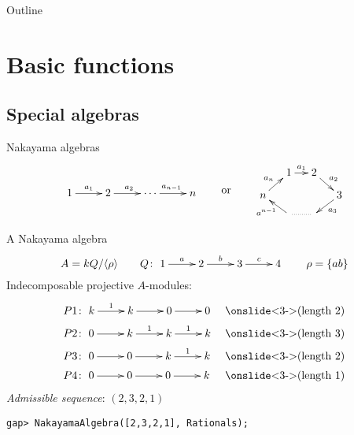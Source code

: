\newcommand{\QPAIntroPartNumber}{2}




\begin{frame}
  \titlepage
\end{frame}

\begin{frame}{Outline}
  \tableofcontents
\end{frame}

\section{Basic functions}

\subsection{Special algebras}

\begin{frame}{Nakayama algebras}
\[
\vcenter{\xymatrix{
1 \ar[r]^{a_1} &
2 \ar[r]^{a_2} &
\cdots
  \ar[r]^{a_{n-1}} &
n
}}
\qquad\text{or}\qquad
\vcenter{\xymatrix@R=.8em@C=1.2em{
& 
1 \ar[r]^{a_1} &
2 \ar[dr]^{a_2} \\
n \ar[ur]^{a_n} &&&
3 \ar[dl]^{a_3} \\
&
\ar[ul]^{a^{n-1}} &
\ar@{.}[l]
}}
\]
\end{frame}

\begin{frame}[fragile]{A Nakayama algebra}
\[
A = kQ/\langle\rho\rangle
\qquad
Q\colon
\xymatrix{
1 \ar[r]^{a} &
2 \ar[r]^{b} &
3 \ar[r]^{c} &
4}
\qquad
\rho = \{ ab \}
\]
Indecomposable projective $A$-modules:
\begin{align*}
P1&\colon
\xymatrix{
k \ar[r]^1 &
k \ar[r] &
0 \ar[r] &
0}
&&\text{\onslide<3->{(length 2)}}
\\
P2&\colon
\xymatrix{
0 \ar[r] &
k \ar[r]^1 &
k \ar[r]^1 &
k}
&&\text{\onslide<3->{(length 3)}}
\\
P3&\colon
\xymatrix{
0 \ar[r] &
0 \ar[r] &
k \ar[r]^1 &
k}
&&\text{\onslide<3->{(length 2)}}
\\
P4&\colon
\xymatrix{
0 \ar[r] &
0 \ar[r] &
0 \ar[r] &
k}
&&\text{\onslide<3->{(length 1)}}
\end{align*}
\emph{Admissible sequence}: $(2,3,2,1)$
\begin{verbatim}
gap> NakayamaAlgebra([2,3,2,1], Rationals);
\end{verbatim}
\end{frame}

